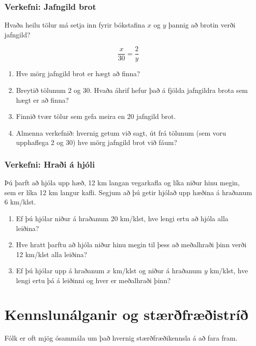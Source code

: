 \documentclass[
  icelandic,
]{book}
\providecommand{\tightlist}{%
  \setlength{\itemsep}{0pt}\setlength{\parskip}{0pt}}
\theoremstyle{definition}
\theoremstyle{definition}
\theoremstyle{definition}
\theoremstyle{definition}
\theoremstyle{remark}
\begin{document}
\subsection{Verkefni: Jafngild brot}\label{verkefni-jafngild}

Hvaða heilu tölur má setja inn fyrir bókstafina \(x\) og \(y\) þannig að brotin verði jafngild?

\[
 \dfrac{x}{30} = \dfrac{2}{y} 
\]

\begin{enumerate}
\def\labelenumi{\alph{enumi}.}
\tightlist
\item
  Hve mörg jafngild brot er hægt að finna?
\item
  Breytið tölunum 2 og 30. Hvaða áhrif hefur það á fjölda jafngildra brota sem hægt er að finna?
\item
  Finnið tvær tölur sem gefa meira en 20 jafngild brot.
\item
  Almenna verkefnið: hvernig getum við sagt, út frá tölunum (sem voru upphaflega 2 og 30) hve mörg jafngild brot við fáum?
\end{enumerate}

\subsection{Verkefni: Hraði á hjóli}\label{verkefni-hradi-hjol}

Þú þarft að hjóla upp hæð, 12 km langan vegarkafla og líka niður hinu megin, sem er líka 12 km langur kafli. Segjum að þú getir hjólað upp hæðina á hraðanum 6 km/klst.

\begin{enumerate}
\def\labelenumi{\alph{enumi}.}
\tightlist
\item
  Ef þú hjólar niður á hraðanum 20 km/klst, hve lengi ertu að hjóla alla leiðina?
\item
  Hve hratt þarftu að hjóla niður hinu megin til þess að meðalhraði þinn verði 12 km/klst alla leiðina?
\item
  Ef þú hjólar upp á hraðanum \(x\) km/klst og niður á hraðanum \(y\) km/klst, hve lengi ertu þá á leiðinni og hver er meðalhraði þinn?
\end{enumerate}

\chapter{Kennslunálganir og stærðfræðistríð}\label{nalgangir-strid}

Fólk er oft mjög ósammála um það hvernig stærðfræðikennsla á að fara fram.
\end{document}
